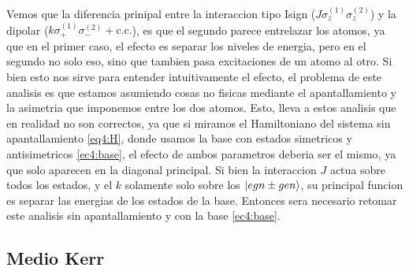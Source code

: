 Vemos que la diferencia prinipal entre la interaccion tipo Isign ($J\sigma_z^{(1)}\sigma_z^{(2)}$) y la dipolar ($k\sigma_+^{(1)}\sigma_-^{(2)}+\text{c.c.}$), es que el segundo parece entrelazar los atomos, ya que en el primer caso, el efecto es separar los niveles de energia, pero en el segundo no solo eso, sino que tambien pasa excitaciones de un atomo al otro. Si bien esto nos sirve para entender intuitivamente el efecto, el problema de este analisis es que estamos asumiendo cosas no fisicas mediante el apantallamiento y la asimetria que imponemos entre los dos atomos. Esto, lleva a estos analisis que en realidad no son correctos, ya que si miramos el Hamiltoniano del sistema sin apantallamiento \ref{eq4:H}, donde usamos la base con estados simetricos y antisimetricos \ref{ec4:base}, el efecto de ambos parametros deberia ser el mismo, ya que solo aparecen en la diagonal principal. Si bien la interaccion $J$ actua sobre todos los estados, y el $k$ solamente solo sobre los $\ket{egn\pm gen}$, su principal funcion es separar las energias de los estados de la base.
Entonces sera necesario retomar este analisis sin apantallamiento y con la base \ref{ec4:base}.
\subsection{Medio Kerr}

